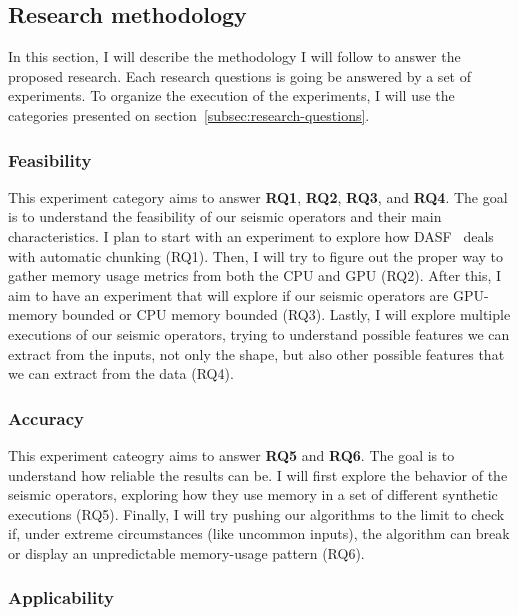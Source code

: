 \subsection{Research methodology}
\label{subsec:research-methodology}

In this section, I will describe the methodology I will follow to answer the proposed research.
Each research questions is going be answered by a set of experiments.
To organize the execution of the experiments, I will use the categories presented on section~\ref{subsec:research-questions}.

\subsubsection{Feasibility}

This experiment category aims to answer \textbf{RQ1}, \textbf{RQ2}, \textbf{RQ3}, and \textbf{RQ4}.
The goal is to understand the feasibility of our seismic operators and their main characteristics.
I plan to start with an experiment to explore how \ac{DASF}~\cite{dasf} deals with automatic chunking (RQ1).
Then, I will try to figure out the proper way to gather memory usage metrics from both the \ac{CPU} and \ac{GPU} (RQ2).
After this, I aim to have an experiment that will explore if our seismic operators are \ac{GPU}-memory bounded or \ac{CPU} memory bounded (RQ3).
Lastly, I will explore multiple executions of our seismic operators, trying to understand possible features we can extract from the inputs, not only the shape, but also other possible features that we can extract from the data (RQ4).

\subsubsection{Accuracy}

This experiment cateogry aims to answer \textbf{RQ5} and \textbf{RQ6}.
The goal is to understand how reliable the results can be.
I will first explore the behavior of the seismic operators, exploring how they use memory in a set of different synthetic executions (RQ5).
Finally, I will try pushing our algorithms to the limit to check if, under extreme circumstances (like uncommon inputs), the algorithm can break or display an unpredictable memory-usage pattern (RQ6).

\subsubsection{Applicability}

